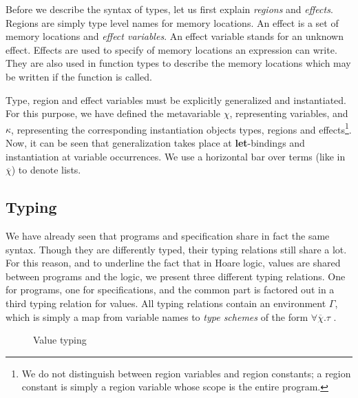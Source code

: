 \documentclass[a4paper]{llncs}
\newcommand{\letml}{{\bf let}}
\newcommand{\propml}{{\bf prop}}
\newcommand{\recml}{{\bf rec}}
\newcommand{\efft}[1]{\langle #1 \rangle}
\newcommand{\alist}[1]{\overline{#1} }
\begin{document}
Before we describe the syntax of types, let us first explain {\em regions} and
{\em effects}. Regions are simply type level names for memory locations. An
effect is a set of memory locations and {\em effect variables}. An effect
variable stands for an unknown effect. Effects are used to specify
of memory locations an expression can write. They are also used in function
types to describe the memory locations which may be written if the function is
called.

Type, region and effect variables must be explicitly generalized and
instantiated. For this purpose, we have defined the metavariable $χ$,
representing variables, and $κ$, representing the corresponding instantiation
objects types, regions and effects\footnote{We do not distinguish between
region variables and region constants; a region constant is simply a region
variable whose scope is the entire program.}. Now, it can be seen that
generalization takes place at \letml-bindings and instantiation at variable
occurrences. We use a horizontal bar over terms (like in ${\overline{χ}}$) to
denote lists.

\subsection{Typing}

We have already seen that programs and specification share in fact the same
syntax. Though they are differently typed, their typing relations still share
a lot. For this reason, and to underline the fact that in Hoare logic, values
are shared between programs and the logic, we present three different typing
relations. One for programs, one for specifications, and the common part is
factored out in a third typing relation for values. All typing relations
contain an environment $Γ$, which is simply a map from variable names to {\em
type schemes} of the form $∀\alist{χ}.τ$ .

\begin{figure}[htbp]
  \caption{Value typing}
  \label{fig:valuetyping}
\end{figure}
\end{document}
